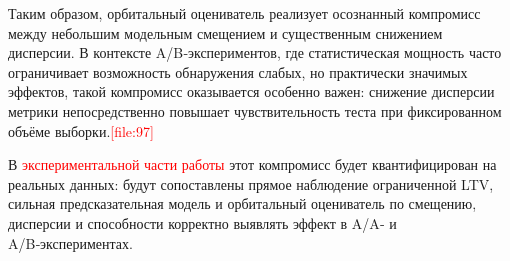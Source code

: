 Таким образом, орбитальный оцениватель реализует осознанный компромисс
между небольшим модельным смещением и существенным снижением дисперсии.
В контексте A/B‑экспериментов, где статистическая мощность часто
ограничивает возможность обнаружения слабых, но практически значимых
эффектов, такой компромисс оказывается особенно важен: снижение
дисперсии метрики непосредственно повышает чувствительность теста
при фиксированном объёме выборки.\textcolor{red}{[file:97]}


В \textcolor{red}{экспериментальной части работы} этот компромисс будет
квантифицирован на реальных данных: будут сопоставлены прямое
наблюдение ограниченной LTV, сильная предсказательная модель и
орбитальный оцениватель по смещению, дисперсии и способности
корректно выявлять эффект в A/A‑ и A/B‑экспериментах.
